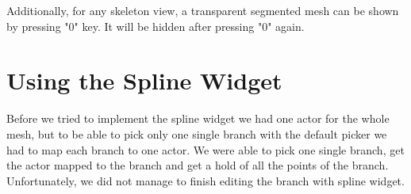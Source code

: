 Additionally, for any skeleton view, a transparent segmented mesh can be shown by pressing "0" key. It will be hidden after pressing "0" again.

\section{Using the Spline Widget}
Before we tried to implement the spline widget we had one actor for the whole mesh, but to be able to pick only one single branch with the default picker we had to map each branch to one actor. We were able to pick one single branch, get the actor mapped to the branch and get a hold of all the points of the branch. Unfortunately, we did not manage to finish editing the branch with spline widget.

